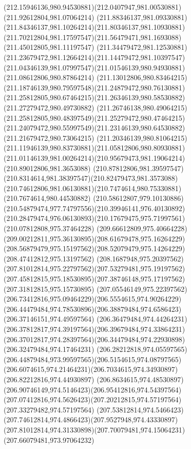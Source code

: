{{  \curveto(212.15946136,980.94530881)(212.0407947,981.00530881)(211.92612804,981.07064214)
  \curveto(211.88346137,981.09330881)(211.84346137,981.10264214)(211.80346137,981.10930881)
  \curveto(211.70212804,981.17597547)(211.56479471,981.1693088)(211.45012805,981.11197547)
  \curveto(211.34479472,981.12530881)(211.23679472,981.12664214)(211.14479472,981.10397547)
  \curveto(211.04346139,981.07997547)(211.01546139,980.94930881)(211.08612806,980.87864214)
  \curveto(211.13012806,980.83464215)(211.18746139,980.79597548)(211.24879472,980.76130881)
  \curveto(211.25812805,980.67464215)(211.26346139,980.58530882)(211.27279472,980.49730882)
  \curveto(211.26746138,980.49064215)(211.25812805,980.48397549)(211.25279472,980.47464215)
  \curveto(211.24079472,980.55997549)(211.23146139,980.64530882)(211.21679472,980.73064215)
  \curveto(211.20346139,980.81064215)(211.11946139,980.83730881)(211.05812806,980.80930881)
  \curveto(211.01146139,981.00264214)(210.95679473,981.19064214)(210.89012806,981.3653088)
  \curveto(210.87812806,981.39597547)(210.8314614,981.38397547)(210.82479473,981.3573088)
  \curveto(210.74612806,981.06130881)(210.7474614,980.75330881)(210.7674614,980.44530882)
  \curveto(210.58612807,979.10130886)(210.54879474,977.74797556)(210.39946141,976.40130892)
  \curveto(210.28479474,976.06130893)(210.17679475,975.71997561)(210.07812808,975.37464228)
  \curveto(209.66612809,975.40664228)(209.00212811,975.36130895)(208.61679478,975.16264229)
  \curveto(208.56879479,975.15197562)(208.52079479,975.14264229)(208.47412812,975.13197562)
  \curveto(208.1687948,975.20397562)(207.81012814,975.22797562)(207.53279481,975.19197562)
  \curveto(207.45812815,975.18530895)(207.38746148,975.17197562)(207.31812815,975.15730895)
  \curveto(207.05546149,975.22397562)(206.73412816,975.09464229)(206.5554615,974.90264229)
  \curveto(206.44479484,974.78530896)(206.38879484,974.6586423)(206.37146151,974.49597564)
  \curveto(206.36479484,974.44264231)(206.37812817,974.39197564)(206.39679484,974.33864231)
  \curveto(206.37012817,974.28397564)(206.34479484,974.22930898)(206.32479484,974.17464231)
  \curveto(206.28212818,974.05597565)(206.44879484,973.99597565)(206.5154615,974.08797565)
  \curveto(206.6074615,974.21464231)(206.7034615,974.34930897)(206.82212816,974.44930897)
  \curveto(206.8634615,974.48530897)(206.90746149,974.5146423)(206.95412816,974.54397564)
  \curveto(207.07412816,974.5626423)(207.20212815,974.57197564)(207.33279482,974.57197564)
  \curveto(207.53812814,974.5466423)(207.74612814,974.4866423)(207.9527948,974.43330897)
  \curveto(207.81012814,974.31330898)(207.70079481,974.15064231)(207.66079481,973.97064232)
}}
